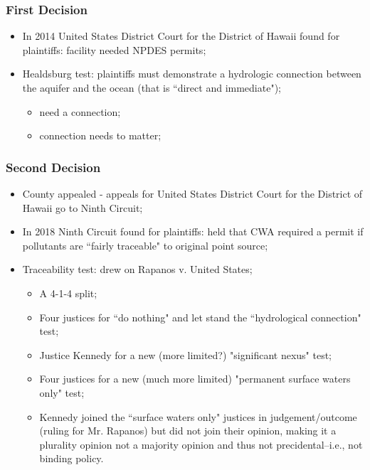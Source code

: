 \documentclass[aspectratio=169]{beamer}
\theoremstyle{principle}
\begin{document}
\begin{frame}
\frametitle{First Decision}

\begin{itemize}
\item In 2014 United States District Court for the District of Hawaii found for plaintiffs: facility needed NPDES permits;
\bigskip
\bigskip
\item Healdsburg test: plaintiffs must demonstrate a hydrologic connection between the aquifer and the ocean (that is ``direct and immediate");
\begin{itemize}
\item need a connection;
\item connection needs to matter;
\end{itemize}
\end{itemize}
\end{frame}

\begin{frame}
\frametitle{Second Decision}

\begin{itemize}
\item County appealed - appeals for United States District Court for the District of Hawaii go to Ninth Circuit;
\bigskip
\item In 2018 Ninth Circuit found for plaintiffs: held that CWA required a permit if pollutants are ``fairly traceable" to original point source;
\bigskip
\item Traceability test: drew on Rapanos v. United States;
\begin{itemize}
\item A 4-1-4 split;
\item Four justices for ``do nothing" and let stand the ``hydrological connection" test;
\item Justice Kennedy for a new (more limited?) "significant nexus" test;
\item Four justices for a new (much more limited) "permanent surface waters only" test;
\item Kennedy joined the ``surface waters only" justices in judgement/outcome (ruling for Mr. Rapanos) but did not join their opinion, making it a plurality opinion not a majority opinion and thus not precidental--i.e., not binding policy. 
\end{itemize}
\end{itemize}
\end{frame}
\end{document}

